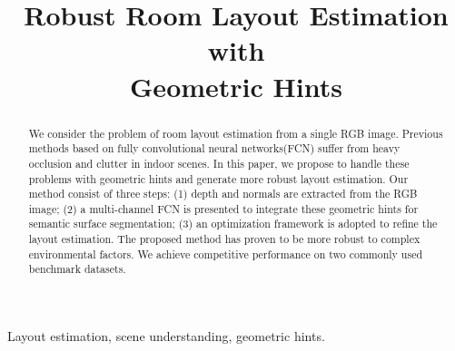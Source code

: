 \documentclass{article}
\title{Robust Room Layout Estimation with\\
	Geometric Hints}
\newcommand{\comments}[1]{}
\begin{document}
%
\maketitle
%
\begin{abstract}
We consider the problem of room layout estimation from a single RGB image. Previous methods based on fully convolutional neural networks(FCN) suffer from heavy occlusion and clutter in indoor scenes. In this paper, we propose to handle these problems with geometric hints and generate more robust layout estimation. Our method consist of three steps: (1) depth and normals are extracted from the RGB image; (2) a multi-channel FCN is presented to integrate these geometric hints for semantic surface segmentation; (3) an optimization framework is adopted to refine the layout estimation. The proposed method has proven to be more robust to complex environmental factors. We achieve competitive performance on two commonly used benchmark datasets. 
	
\comments{
Layout estimation from a single RGB image is a fundamental and indispensable problem for indoor scene understanding, which models the inner space as a 3D cuboid, including floor, ceiling and walls and their boundaries. However, it is significantly challenging to extract layout structure with large clutter and occlusions.
In this paper, we propose a geometric based networks for a single RGB image which encodes depth and normal information from image itself. We have demonstrated that using geometric information jointly works better than using only RGB images for indoor scene layout estimation with fully convolutional neural networks(FCNN). Then an optimization framework takes full advantages of semantci surface segmentation from network and geometric constraints to generate final layout estimates. The proposed method has proven to achieve competitive accuracy of layout estimation on two commonly used benchmark datasets.}
\end{abstract}
%
\begin{keywords}
Layout estimation, scene understanding, geometric hints.
\end{keywords}
%





\end{document}
